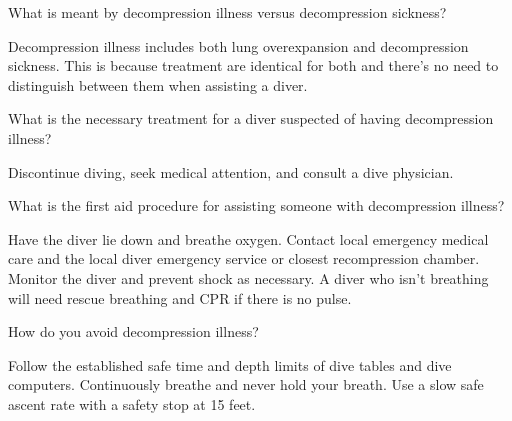 	\begin{qanda}
		\begin{question}
What is meant by decompression illness versus decompression sickness?
		\end{question}

		\begin{answer}
Decompression illness includes both lung overexpansion and decompression sickness.  This is because treatment are identical for both and there's no need to distinguish between them when assisting a diver.
		\end{answer}
	\end{qanda}

	\begin{qanda}
		\begin{question}
What is the necessary treatment for a diver suspected of having decompression illness?
		\end{question}

		\begin{answer}
Discontinue diving, seek medical attention, and consult a dive physician.
		\end{answer}
	\end{qanda}

	\begin{qanda}
		\begin{question}
What is the first aid procedure for assisting someone with decompression illness?
		\end{question}

		\begin{answer}
Have the diver lie down and breathe oxygen.  Contact local emergency medical care and the local diver emergency service or closest recompression chamber.  Monitor the diver and prevent shock as necessary.  A diver who isn't breathing will need rescue breathing and CPR if there is no pulse.
		\end{answer}
	\end{qanda}

	\begin{qanda}
		\begin{question}
How do you avoid decompression illness?
		\end{question}

		\begin{answer}
Follow the established safe time and depth limits of dive tables and dive computers.  Continuously breathe and never hold your breath.  Use a slow safe ascent rate with a safety stop at 15 feet.
		\end{answer}
	\end{qanda}

